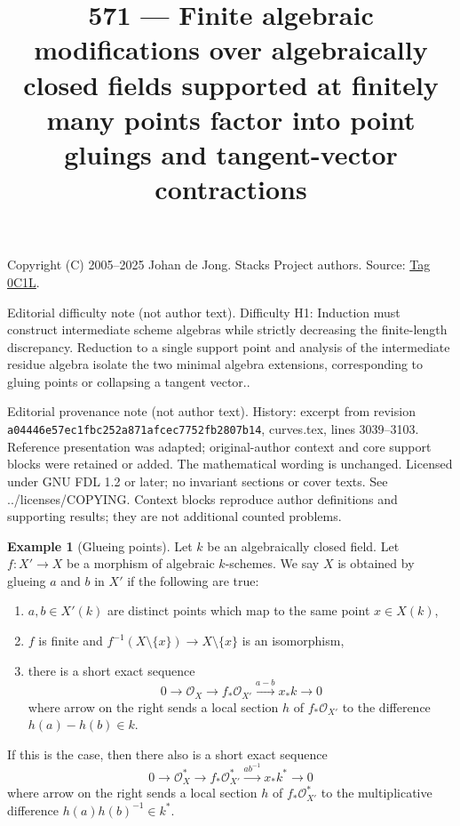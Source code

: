 \documentclass{amsart}
\theoremstyle{plain}
\theoremstyle{definition}
\newtheorem{example}[subsection]{Example}
\theoremstyle{remark}
\numberwithin{equation}{subsection}
\begin{document}
\title[Stacks Project, Tag 0C1L]{571 --- Finite algebraic modifications over algebraically closed fields supported at finitely many points factor into point gluings and tangent-vector contractions}
\maketitle
\noindent Copyright (C) 2005--2025 Johan de Jong. Stacks Project authors. Source: \href{https://stacks.math.columbia.edu/tag/0C1L}{Tag 0C1L}.

\noindent Editorial difficulty note (not author text). Difficulty H1: Induction must construct intermediate scheme algebras while strictly decreasing the finite-length discrepancy. Reduction to a single support point and analysis of the intermediate residue algebra isolate the two minimal algebra extensions, corresponding to gluing points or collapsing a tangent vector..

\noindent Editorial provenance note (not author text). History: excerpt from revision \texttt{a0444\allowbreak 6e57e\allowbreak c1fbc\allowbreak 252a8\allowbreak 71afc\allowbreak ec775\allowbreak 2fb28\allowbreak 07b14}, curves.tex, lines 3039--3103. Reference presentation was adapted; original-author context and core support blocks were retained or added. The mathematical wording is unchanged. Licensed under GNU FDL 1.2 or later; no invariant sections or cover texts. See ../licenses/COPYING. Context blocks reproduce author definitions and supporting results; they are not additional counted problems.

\begin{example}[Glueing points]
\label{example-glue-points}
Let $k$ be an algebraically closed field. Let $f : X' \to X$
be a morphism of algebraic $k$-schemes. We say $X$ is
obtained by glueing $a$ and $b$ in $X'$ if the following are true:
\begin{enumerate}
\item $a, b \in X'(k)$ are distinct points which map to the same
point $x \in X(k)$,
\item $f$ is finite and
$f^{-1}(X \setminus \{x\}) \to X \setminus \{x\}$ is an isomorphism,
\item there is a short exact sequence
$$
0 \to \mathcal{O}_X \to f_*\mathcal{O}_{X'} \xrightarrow{a - b} x_*k \to 0
$$
where arrow on the right sends a local section $h$ of $f_*\mathcal{O}_{X'}$
to the difference $h(a) - h(b) \in k$.
\end{enumerate}
If this is the case, then there also is a short exact sequence
$$
0 \to \mathcal{O}_X^* \to f_*\mathcal{O}_{X'}^*
\xrightarrow{ab^{-1}} x_*k^* \to 0
$$
where arrow on the right sends a local section $h$ of $f_*\mathcal{O}_{X'}^*$
to the multiplicative difference $h(a)h(b)^{-1} \in k^*$.
\end{example}
\end{document}
